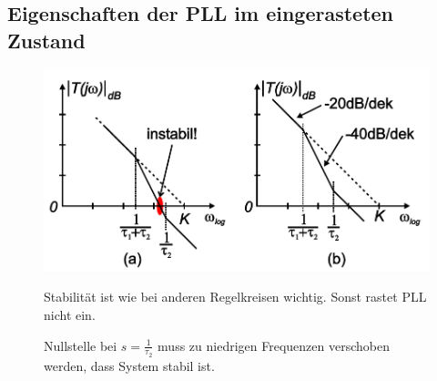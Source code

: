 \subsection{Eigenschaften der PLL im eingerasteten Zustand}
\begin{figure}[h!]
	\begin{minipage}{0.5\textwidth} 
       \includegraphics[width=1\textwidth]{images/PLL_Stabilitaet}
	\end{minipage}
	\begin{minipage}{0.5\textwidth} 
       \begin{compactitem}
          \item Stabilität ist wie bei anderen Regelkreisen wichtig. Sonst rastet PLL nicht ein.
          \item Nullstelle bei $s=\frac{1}{\tau_2}$ muss zu niedrigen Frequenzen verschoben werden, dass System stabil ist.
       \end{compactitem}
	\end{minipage}
\end{figure}

